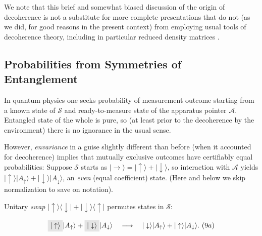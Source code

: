 \documentclass[aps,amsmath,amssymb,amsfonts,12pt]{revtex4-1}
\newcommand{\ket}[1]    {| #1 \rangle}
\newcommand{\kb}[2]     {| #1 \rangle \! \langle #2 |}
\newcommand{\cS}        {{\mathcal S}}
\newcommand{\cA}        {{\mathcal A}}
\newcommand{\+}         {\dagger}
\newcommand\hocom[1]{}%
\begin{document}
{We note that this brief and somewhat biased discussion of the origin of decoherence is not a substitute for more complete presentations that do not (as we did, for good reasons in the present context) from employing usual tools of decoherence theory, including in particular reduced density matrices \cite{36,71,75}.

\subsection{Probabilities from Symmetries of Entanglement}

\hocom{We start our derivation of the Born's rule with the case of equal probabilities: When the Schmidt
coefficients are equal, symmetries of entanglement force one to conclude that the probabilities
must be also equal. The crux of the proof is that, after a swap on the system, the probabilities of
the swapped states must be equal to the probabilities of their new partners in the
Schmidt decomposition (which did not yet get swapped). But -- when the coefficients are equal -- a swap on
the environment restores the original states. So the probabilities must be the same as if the swap
never happened. These two requirements (that a swap exchanges probabilities, and that it does not
change them) can be simultaneously satisfied only when probabilities are equal.}

In quantum physics one seeks probability of measurement outcome starting from a known state of $\cS$ and ready-to-measure state of the apparatus pointer $\cA$. Entangled state of the whole is pure, so (at least prior to the decoherence by the environment) there is no ignorance in the usual sense. 

However, 
{\it envariance} in a guise slightly different than before (when it accounted for decoherence) implies that mutually exclusive outcomes have certifiably equal probabilities:
Suppose $\cS$ starts as $\ket \rightarrow = { \ket \uparrow + \ket \downarrow} $, so interaction with $\cA$ yields $ { \ket \uparrow \ket {A_\uparrow}  + \ket \downarrow \ket {A_\downarrow}}$, an {\it even} (equal coefficient) state. 
(Here and below we skip normalization to save on notation).

Unitary {\it swap} $ \kb \uparrow \downarrow + \kb \downarrow \uparrow$ permutes states in $\cS$:

\vspace{-.22cm}

\[
\tikz[baseline]{
            \node[fill=gray!20,anchor=base] (t1)
            {$|\uparrow \rangle$};
        } 
| {A_\uparrow} \rangle 
+
\tikz[baseline]{
            \node[fill=gray!20,anchor=base] (t2)
            {$|\downarrow \rangle$};
        }
|{A_\downarrow} \rangle
\quad \longrightarrow \quad
| \downarrow\rangle |{A_\uparrow} \rangle + |\uparrow  \rangle | {A_\downarrow}\rangle . \ \eqnum ((9a)
\]
%
%

}
\end{document}
